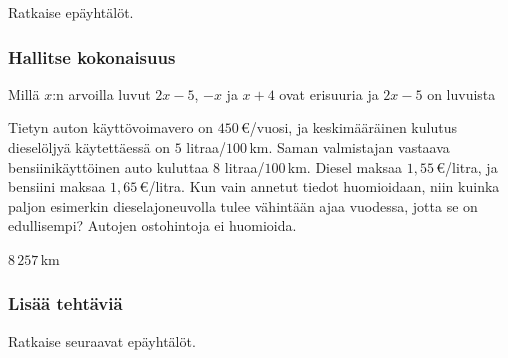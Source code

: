 \begin{tehtavasivu}
\begin{tehtava}
\begin{vastaus}
	\end{vastaus}
\end{tehtava}

\begin{tehtava}
    Ratkaise epäyhtälöt.
    \begin{vastaus}
    \end{vastaus}
\end{tehtava}

\subsubsection*{Hallitse kokonaisuus}

\begin{tehtava}
	Millä $x$:n arvoilla luvut $2x - 5$, $-x$ ja $x + 4$ ovat erisuuria ja $2x - 5$ on luvuista
	\begin{vastaus}
	\end{vastaus}
\end{tehtava}

\begin{tehtava}
	Tietyn auton käyttövoimavero on $450$\,€/vuosi, ja keskimääräinen kulutus dieselöljyä käytettäessä on $5$ litraa/$100$\,km. Saman valmistajan vastaava bensiinikäyttöinen auto kuluttaa $8$ litraa/$100$\,km. Diesel maksaa $1,55$\,€/litra, ja bensiini maksaa $1,65$\,€/litra. Kun vain annetut tiedot huomioidaan, niin kuinka paljon esimerkin dieselajoneuvolla tulee vähintään ajaa vuodessa, jotta se on edullisempi? Autojen ostohintoja ei huomioida.
    \begin{vastaus}
        $8\,257$\,km
    \end{vastaus}
\end{tehtava}

\subsubsection*{Lisää tehtäviä}

\begin{tehtava}
    Ratkaise seuraavat epäyhtälöt.
    \begin{vastaus}
    \end{vastaus}
\end{tehtava}


\end{tehtavasivu}
